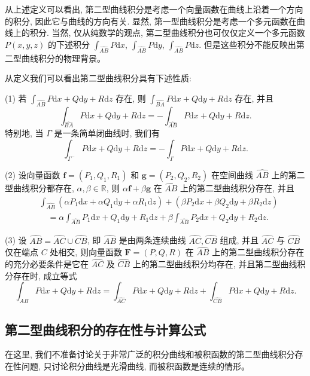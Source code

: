 \documentclass[UTF8,12pt,a4paper,fontset=fandol]{ctexart}
\begin{document}
从上述定义可以看出, 第二型曲线积分是考虑一个向量函数在曲线上沿着一个方向的积分, 因此它与曲线的方向有关. 显然, 第一型曲线积分是考虑一个多元函数在曲线上的积分. 当然, 仅从纯数学的观点, 第二型曲线积分也可仅仅定义一个多元函数 $P(x,y,z)$ 的下述积分 $\int_{\widehat{AB}}P\mathrm dx$, $\int_{\widehat{AB}}P\mathrm dy$, $\int_{\widehat{AB}}P\mathrm dz$. 但是这些积分不能反映出第二型曲线积分的物理背景。

从定义我们可以看出第二型曲线积分具有下述性质:

(1) 若 $\int_{\widehat{AB}}P\mathrm dx+Q\mathrm dy+R\mathrm dz$ 存在, 则 $\int_{\widehat{BA}}P\mathrm dx+Q\mathrm dy+R\mathrm dz$ 存在, 并且
\[
  \int_{\widehat{BA}}P\mathrm dx+Q\mathrm dy+R\mathrm dz
  =-\int_{\widehat{AB}}P\mathrm dx+Q\mathrm dy+R\mathrm dz.
\]
特别地, 当 $\Gamma$ 是一条简单闭曲线时, 我们有
\[
  \int_{\Gamma^-}P\mathrm dx+Q\mathrm dy+R\mathrm dz
  =-\int_\Gamma P\mathrm dx+Q\mathrm dy+R\mathrm dz.
\]

(2) 设向量函数 $\boldsymbol f=(P_1,Q_1,R_1)$ 和 $\boldsymbol g=(P_2,Q_2,R_2)$ 在空间曲线 $\widehat{AB}$ 上的第二型曲线积分都存在, $\alpha,\beta\in\mathbb R$, 则 $\alpha\boldsymbol f+\beta\boldsymbol g$ 在 $\widehat{AB}$ 上的第二型曲线积分存在, 并且
\[
\begin{aligned}
  &\int_{\widehat{AB}}(\alpha P_1\mathrm dx+\alpha Q_1\mathrm dy+\alpha R_1\mathrm dz)
  +(\beta P_2\mathrm dx+\beta Q_2\mathrm dy+\beta R_2\mathrm dz)\\
  &\quad=\alpha\int_{\widehat{AB}}P_1\mathrm dx+Q_1\mathrm dy+R_1\mathrm dz
  +\beta\int_{\widehat{AB}}P_2\mathrm dx+Q_2\mathrm dy+R_2\mathrm dz.
\end{aligned}
\]

(3) 设 $\widehat{AB}=\widehat{AC}\cup\widehat{CB}$, 即 $\widehat{AB}$ 是由两条连续曲线 $\widehat{AC},\widehat{CB}$ 组成, 并且 $\widehat{AC}$ 与 $\widehat{CB}$ 仅在端点 $C$ 处相交, 则向量函数 $\boldsymbol F=(P,Q,R)$ 在 $\widehat{AB}$ 上的第二型曲线积分存在的充分必要条件是它在 $\widehat{AC}$ 及 $\widehat{CB}$ 上的第二型曲线积分均存在, 并且第二型曲线积分存在时, 成立等式
\[
  \int_{\widehat{AB}}P\mathrm dx+Q\mathrm dy+R\mathrm dz
  =\int_{\widehat{AC}}P\mathrm dx+Q\mathrm dy+R\mathrm dz
  +\int_{\widehat{CB}}P\mathrm dx+Q\mathrm dy+R\mathrm dz.
\]

\subsection{第二型曲线积分的存在性与计算公式}

在这里, 我们不准备讨论关于非常广泛的积分曲线和被积函数的第二型曲线积分存在性问题, 只讨论积分曲线是光滑曲线, 而被积函数是连续的情形。
\end{document}
